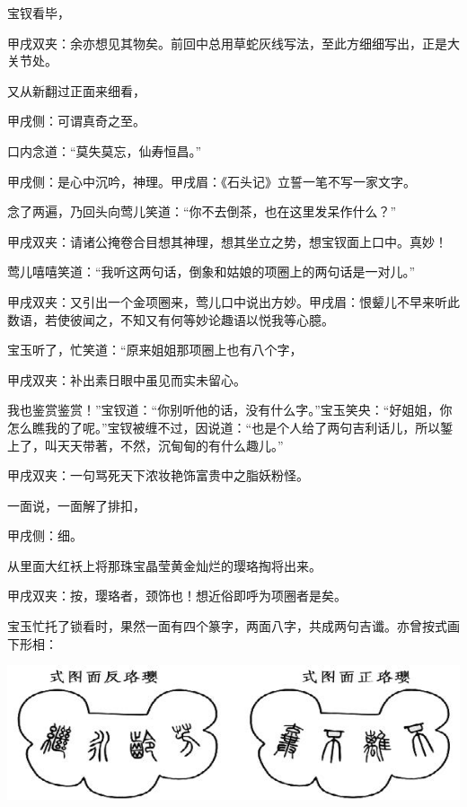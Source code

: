 \begin{parag}
    宝钗看毕，\begin{note}甲戌双夹：余亦想见其物矣。前回中总用草蛇灰线写法，至此方细细写出，正是大关节处。\end{note}又从新翻过正面来细看，\begin{note}甲戌侧：可谓真奇之至。\end{note}口内念道：“莫失莫忘，仙寿恒昌。”\begin{note}甲戌侧：是心中沉吟，神理。甲戌眉：《石头记》立誓一笔不写一家文字。\end{note}念了两遍，乃回头向莺儿笑道：“你不去倒茶，也在这里发呆作什么？”\begin{note}甲戌双夹：请诸公掩卷合目想其神理，想其坐立之势，想宝钗面上口中。真妙！\end{note}莺儿嘻嘻笑道：“我听这两句话，倒象和姑娘的项圈上的两句话是一对儿。”\begin{note}甲戌双夹：又引出一个金项圈来，莺儿口中说出方妙。甲戌眉：恨颦儿不早来听此数语，若使彼闻之，不知又有何等妙论趣语以悦我等心臆。\end{note}宝玉听了，忙笑道：“原来姐姐那项圈上也有八个字，\begin{note}甲戌双夹：补出素日眼中虽见而实未留心。\end{note}我也鉴赏鉴赏！”宝钗道：“你别听他的话，没有什么字。”宝玉笑央：“好姐姐，你怎么瞧我的了呢。”宝钗被缠不过，因说道：“也是个人给了两句吉利话儿，所以錾上了，叫天天带著，不然，沉甸甸的有什么趣儿。”\begin{note}甲戌双夹：一句骂死天下浓妆艳饰富贵中之脂妖粉怪。\end{note}一面说，一面解了排扣，\begin{note}甲戌侧：细。\end{note}从里面大红袄上将那珠宝晶莹黄金灿烂的璎珞掏将出来。\begin{note}甲戌双夹：按，璎珞者，颈饰也！想近俗即呼为项圈者是矣。\end{note}宝玉忙托了锁看时，果然一面有四个篆字，两面八字，共成两句吉谶。亦曾按式画下形相：
\end{parag}

\includegraphics[]{8-2}

